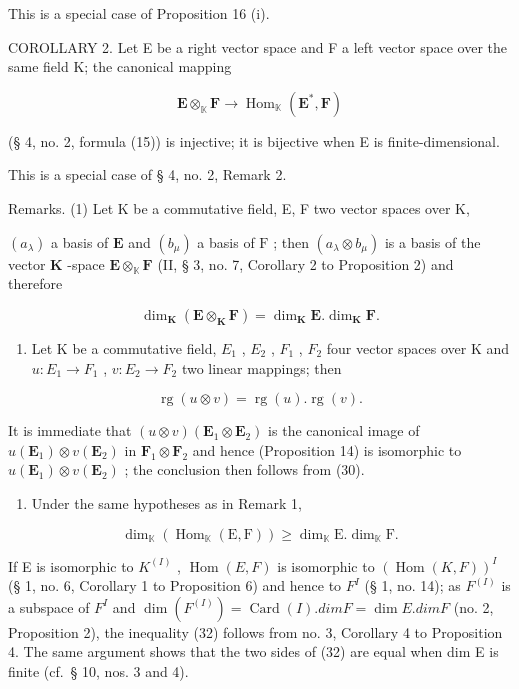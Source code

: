 This is a special case of Proposition 16 (i).

COROLLARY 2. Let E be a right vector space and F a left vector space over the same field K; the canonical mapping

\[
\mathbf {E} \otimes_ {\mathbb {K}} \mathbf {F} \rightarrow \operatorname{Hom} _ {\mathbb {K}} (\mathbf {E} ^ {*}, \mathbf {F})\tag{29}
\]

(§ 4, no. 2, formula (15)) is injective; it is bijective when E is finite-dimensional.

This is a special case of § 4, no. 2, Remark 2.

Remarks. (1) Let K be a commutative field, E, F two vector spaces over K,

\((a_{\lambda})\) a basis of \(\mathbf{E}\) and \((b_{\mu})\) a basis of \(\mathrm{F}\) ; then \((a_{\lambda} \otimes b_{\mu})\) is a basis of the vector \(\mathbf{K}\) -space \(\mathbf{E} \otimes_{\mathbb{K}} \mathbf{F}\) (II, § 3, no. 7, Corollary 2 to Proposition 2) and therefore

\[
\dim_ {\mathbf {K}} (\mathbf {E} \otimes_ {\mathbf {K}} \mathbf {F}) = \dim_ {\mathbf {K}} \mathbf {E}. \dim_ {\mathbf {K}} \mathbf {F}.\tag{30}
\]

\begin{enumerate}
\def\labelenumi{(\arabic{enumi})}
\setcounter{enumi}{1}
\tightlist
\item
  Let K be a commutative field, \(E_{1}\) , \(E_{2}\) , \(F_{1}\) , \(F_{2}\) four vector spaces over K and \(u: E_{1} \rightarrow F_{1}\) , \(v: E_{2} \rightarrow F_{2}\) two linear mappings; then
\end{enumerate}

\[
\operatorname{rg} (u \otimes v) = \operatorname{rg} (u). \operatorname{rg} (v).\tag{31}
\]

It is immediate that \((u\otimes v)(\mathbf{E}_1\otimes \mathbf{E}_2)\) is the canonical image of \(u(\mathbf{E}_1)\otimes v(\mathbf{E}_2)\) in \(\mathbf{F}_1\otimes \mathbf{F}_2\) and hence (Proposition 14) is isomorphic to \(u(\mathbf{E}_1)\otimes v(\mathbf{E}_2)\) ; the conclusion then follows from (30).

\begin{enumerate}
\def\labelenumi{(\arabic{enumi})}
\setcounter{enumi}{2}
\tightlist
\item
  Under the same hypotheses as in Remark 1,
\end{enumerate}

\[
\dim_ {\mathbb {K}} (\operatorname{Hom} _ {\mathbb {K}} (\mathrm{E}, \mathrm{F})) \geqslant \dim_ {\mathbb {K}} \mathrm{E}. \dim_ {\mathbb {K}} \mathrm{F}.\tag{32}
\]

If E is isomorphic to \(K^{(I)}\) , \(\operatorname{Hom}(E, F)\) is isomorphic to \((\operatorname{Hom}(K, F))^{I}\) (§ 1, no. 6, Corollary 1 to Proposition 6) and hence to \(F^{I}\) (§ 1, no. 14); as \(F^{(I)}\) is a subspace of \(F^{I}\) and \(\dim(F^{(I)}) = \operatorname{Card}(I).dim F = \dim E. dim F\) (no. 2, Proposition 2), the inequality (32) follows from no. 3, Corollary 4 to Proposition 4. The same argument shows that the two sides of (32) are equal when dim E is finite (cf.~§ 10, nos. 3 and 4).


